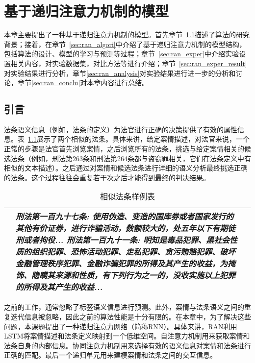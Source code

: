 
\chapter{基于递归注意力机制的模型}
本章主要提出了一种基于递归注意力机制的模型。首先章节~\ref{sec:ran_intro}描述了算法的研究背景；接着，在章节~\ref{sec:ran_algori}中介绍了基于递归注意力机制的模型结构，包括算法的设计、模型的学习与预测等过程；章节~\ref{sec:ran_exper}中介绍实验设置相关内容，对实验数据集，对比方法等进行介绍；章节~\ref{sec:ran_exper_result}对实验结果进行分析，章节\ref{sec:ran_analysis}对实验结果进行进一步的分析和讨论，章节\ref{sec:ran_conclu}对本章内容进行总结。

\section{引言}
\label{sec:ran_intro}
法条语义信息（例如，法条的定义）为法官进行正确的决策提供了有效的属性信息。表~\ref{t:similar_article}展示了两个相似的法条。具体来讲，给定案情描述，对法官来说，一个正常的步骤是法官首先浏览案情，之后浏览所有的法条，挑选与给定案情相关的候选法条（例如，刑法第263条和刑法第264条都与盗窃罪相关，它们在法条定义中有相似的文本描述）。之后通过对案情和候选法条进行详细的语义分析最终挑选正确的法条。这个过程往往会重复若干次之后才能得到最终的判决结果。

\begin{table}[htb]
    \caption{相似法条样例表}
    \label{t:similar_article}
    \centering
    \begin{tabular}{lp{12cm}p{7cm}}
    \hline
    &\emph{\textbf{刑法第一百九十七条}: 使用伪造、变造的国库券或者国家发行的其他有价证券，进行\emph{\textbf{诈骗}}活动，数额较大的，处五年以下有期徒刑或者拘役... \newline
    \textbf{刑法第一百九十一条}: 明知是毒品犯罪、黑社会性质的组织犯罪、恐怖活动犯罪、走私犯罪、贪污贿赂犯罪、破坏金融管理秩序犯罪、\emph{\textbf{金融诈骗}}犯罪的所得及其产生的收益，为掩饰、隐瞒其来源和性质，有下列行为之一的，没收实施以上犯罪的所得及其产生的收益...}\\
    \hline
    \end{tabular}
\end{table}

之前的工作，通常忽略了标签语义信息进行预测。此外，案情与法条语义之间的重复迭代信息被忽略，因此之前的算法性能是十分有限的。在本章中，为了解决这些问题，本课题提出了一种递归注意力网络（简称RNN）。具体来讲，RAN利用LSTM将案情描述和法条定义映射到一个低维空间。自注意力机制用来获取案情和法条自身的内部信息。协同注意力机制用来选择有效的语义信息对案情和法条进行正确的匹配。最后一个递归单元用来建模案情和法条之间的交互信息。

